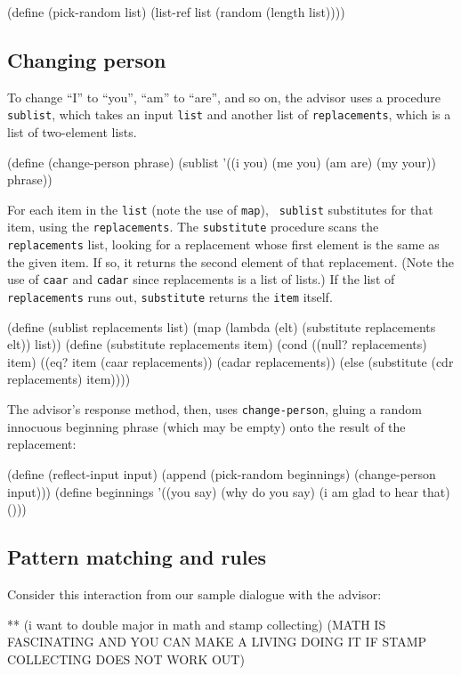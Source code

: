 \beginlisp
(define (pick-random list)
  (list-ref list (random (length list))))
\endlisp

\subsection{Changing person}

To change ``I'' to ``you'', ``am'' to ``are'', and so on, the advisor
uses a procedure {\tt sublist}, which takes an input {\tt list} and
another list of {\tt replacements}, which is a list of two-element
lists.

\beginlisp
(define (change-person phrase)
  (sublist '((i you) (me you) (am are) (my your))
           phrase))
\endlisp

\noindent

For each item in the {\tt list} (note the use of {\tt map}), {\tt
sublist} substitutes for that item, using the {\tt replacements}.  The
{\tt substitute} procedure scans the {\tt replacements} list, looking
for a replacement whose first element is the same as the given item.
If so, it returns the second element of that replacement.  (Note the
use of {\tt caar} and {\tt cadar} since replacements is a list of
lists.)  If the list of {\tt replacements} runs out, {\tt substitute}
returns the {\tt item} itself.

\beginlisp
(define (sublist replacements list)
  (map (lambda (elt) (substitute replacements elt))
       list))
\null
(define (substitute replacements item)
  (cond ((null? replacements) item)
        ((eq? item (caar replacements)) (cadar replacements))
        (else (substitute (cdr replacements) item))))
\endlisp

The advisor's response method, then, uses {\tt change-person}, gluing
a random innocuous beginning phrase (which may be empty) onto the
result of the replacement:

\beginlisp
(define (reflect-input input)
  (append (pick-random beginnings) (change-person input)))
\null
(define beginnings
  '((you say)
    (why do you say)
    (i am glad to hear that)
    ()))
\endlisp


\subsection{Pattern matching and rules}

Consider this interaction from our sample dialogue with the advisor:

\beginlisp
** (i want to double major in math and stamp collecting)
(MATH IS FASCINATING AND YOU CAN MAKE A LIVING DOING IT
 IF STAMP COLLECTING DOES NOT WORK OUT)
\endlisp

